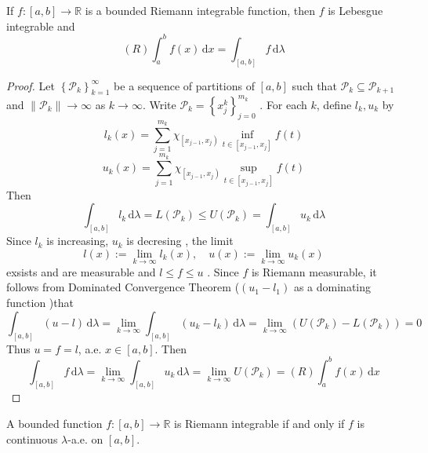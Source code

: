 \documentclass[../main.tex]{subfiles}
\begin{document}
\begin{theorem}{}{}
    If \(  f:\left[ a,b \right]\to \mathbb{R}    \) is a bounded Riemann integrable function, then \(  f  \) is Lebesgue integrable and \[
    \left( R \right)\int_{a}^{b}f\left( x \right)\,\mathrm{d} x= \int_{\left[ a,b \right] }f\,\mathrm{d}  \lambda   
    \]  
\end{theorem}
\begin{proof}
    Let \(  \left\{ \mathcal{P}_{k} \right\}_{k= 1}^{\infty}  \) be a sequence of partitions of \(  \left[ a,b \right]   \) such that \(  \mathcal{P}_{k}\subseteq \mathcal{P}_{k+ 1}  \) and \(  \left\| \mathcal{P}_{k} \right\|\to \infty  \) as \(  k\to \infty  \).     Write \(  \mathcal{P}_{k}= \left\{ x_{j}^{k} \right\}_{j= 0}^{m_{k}}  \) . For each \(  k  \), define \(  l_{k}, u_{k}  \) by    \[
    l_{k}\left( x \right)= \sum _{j= 1}^{m_{k}}\chi _{\left[ x_{j-1},x_{j } \right) }\inf _{t\in \left[ x_{j-1},x_{j } \right] } f\left( t \right) 
    \] \[
    u_{k}\left( x \right)= \sum _{j= 1}^{m_{k}}\chi _{\left[ x_{j-1},x_{j} \right) } \sup _{t\in \left[ x_{j-1},x_{j} \right] }f\left( t \right)  
    \] Then \[
    \int_{[a,b]} l_{k}\,\mathrm{d}  \lambda = L\left( \mathcal{P}_{k} \right)\le  U\left( \mathcal{P}_{k} \right)  =  \int_{[a,b]} u_{k}\,\mathrm{d}  \lambda 
    \]Since \(  l_{k}  \) is increasing, \(  u_{k}  \) is decresing , the limit \[
    l\left( x \right):= \lim_{k\to \infty}l_{k}\left( x \right),\quad u\left( x \right):= \lim_{k\to \infty}u_{k}\left( x \right)    
    \]exsists and are measurable and \(  l \le f \le u  \) . Since \(  f  \) is Riemann measurable, it follows from Dominated Convergence Theorem (\( \left(  u_1-l_1 \right)   \) as a dominating function  )that  \[
    \int_{[a,b]}\left( u-l \right)\,\mathrm{d}  \lambda= \lim_{k\to \infty} \int_{[a,b]}\left( u_{k}-l_{k} \right)\,\mathrm{d}  \lambda = \lim_{k\to \infty}\left( U\left( \mathcal{P}_{k} \right)-L\left( \mathcal{P}_{k} \right)   \right)= 0   
    \] Thus \(  u= f= l  \), a.e. \(  x\in \left[ a,b \right]   \).  Then \[
    \int_{[a,b]}f\,\mathrm{d}  \lambda = \lim_{k\to \infty}\int_{[a,b]}u_{k} \,\mathrm{d}  \lambda = \lim_{k\to \infty}U\left( \mathcal{P}_{k} \right)= \left( R \right)\int_{a}^{b}f\left( x \right)\,\mathrm{d} x   
    \]
\end{proof}

\begin{theorem}{}{}
    A bounded function \(  f:\left[ a,b \right]\to \mathbb{R}    \) is Riemann integrable if and only if \(  f  \) is continuous \(   \lambda   \)-a.e. on \(  \left[ a,b \right]   \).    
\end{theorem}
\end{document}
